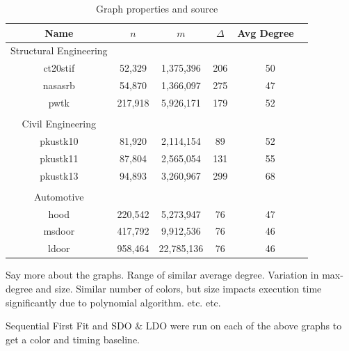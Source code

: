 \documentclass[preprint]{sigplanconf}
\begin{document}
\begin{table}
\scriptsize
\begin{center}
\begin{tabular}{c c c c c}
\hline
Name & $n$ & $m$ & $\Delta$ & Avg Degree \
\\
\hline
Structural Engineering  \\
ct20stif & 52,329 & 1,375,396 & 206 & 50 \\
nasasrb & 54,870 & 1,366,097 & 275 & 47 \\
pwtk  & 217,918 & 5,926,171 & 179 & 52 \\
\\
Civil Engineering \\
pkustk10 & 81,920 & 2,114,154 & 89 & 52 \\
pkustk11 & 87,804 & 2,565,054 & 131 & 55 \\
pkustk13 & 94,893 & 3,260,967 & 299 & 68\\
\\
Automotive \\
hood & 220,542 & 5,273,947 & 76  & 47 \\
msdoor & 417,792 & 9,912,536 & 76 & 46 \\
ldoor & 958,464 & 22,785,136 & 76 & 46 \\

\end{tabular}
\caption{Graph properties and source}
\label{amean_time}
\end{center}
\end{table}



Say more about the graphs.  Range of similar average degree.  Variation in max-degree and size.  Similar number of colors, but size impacts execution time significantly due to polynomial algorithm.  etc. etc.
  

Sequential First Fit and SDO $\&$ LDO were run on each of the above graphs to get a color and timing baseline.  
    
\end{document}
